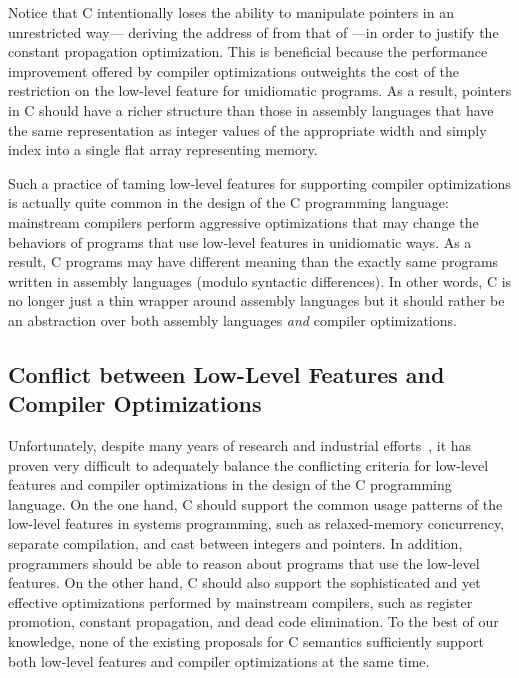 Notice that C intentionally loses the ability to manipulate pointers in an unrestricted way---\eg{}
deriving the address of  from that of ---in order to justify the constant
propagation optimization.  This is beneficial because the performance improvement offered by
compiler optimizations outweights the cost of the restriction on the low-level feature for
unidiomatic programs.  As a result, pointers in C should have a richer structure than those in
assembly languages that have the same representation as integer values of the appropriate width and
simply index into a single flat array representing memory.

Such a practice of taming low-level features for supporting compiler optimizations is actually quite
common in the design of the C programming language: mainstream compilers perform aggressive
optimizations that may change the behaviors of programs that use low-level features in unidiomatic
ways.  As a result, C programs may have different meaning than the exactly same programs written in
assembly languages (modulo syntactic differences).  In other words, C is no longer just a thin
wrapper around assembly languages but it should rather be an abstraction over both assembly
languages \emph{and} compiler optimizations.



\subsection{Conflict between Low-Level Features and Compiler Optimizations}
\label{sec:introduction:problem}

Unfortunately, despite many years of research and industrial efforts~\cite{c18}, it has proven very
difficult to adequately balance the conflicting criteria for low-level features and compiler
optimizations in the design of the C programming language.  On the one hand, C should support the
common usage patterns of the low-level features in systems programming, such as relaxed-memory
concurrency, separate compilation, and cast between integers and pointers.  In addition, programmers
should be able to reason about programs that use the low-level features.  On the other hand, C
should also support the sophisticated and yet effective optimizations performed by mainstream
compilers, such as register promotion, constant propagation, and dead code elimination.  To the best
of our knowledge, none of the existing proposals for C semantics sufficiently support both low-level
features and compiler optimizations at the same time.

